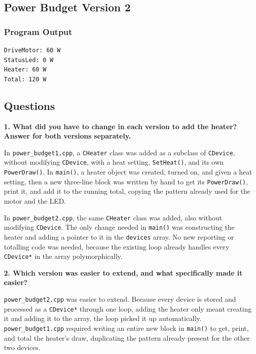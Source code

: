 \documentclass[10pt,a4paper]{article}
\newcommand{\question}[1]{%
    \vspace{5pt}
    \textbf{#1}\par
    \vspace{2pt}
}
\begin{document}
\subsection{Power Budget Version 2}

\subsubsection{Program Output}

\begin{lstlisting}[style=output]
DriveMotor: 60 W
StatusLed: 0 W
Heater: 60 W
Total: 120 W
\end{lstlisting}

\subsection{Questions}

\question{1. What did you have to change in each version to add the heater? Answer for both versions separately.}

In \texttt{power\_budget1.cpp}, a \texttt{CHeater} class was added as a
subclass of \texttt{CDevice}, without modifying \texttt{CDevice}, with a
heat setting, \texttt{SetHeat()}, and its own \texttt{PowerDraw()}. In
\texttt{main()}, a heater object was created, turned on, and given a heat
setting, then a new three-line block was written by hand to get its
\texttt{PowerDraw()}, print it, and add it to the running total,
copying the pattern already used for the motor and the LED.

In \texttt{power\_budget2.cpp}, the same \texttt{CHeater} class was added,
also without modifying \texttt{CDevice}. The only change needed in
\texttt{main()} was constructing the heater and adding a pointer to it in
the \texttt{devices} array. No new reporting or totalling code was needed,
because the existing loop already handles every \texttt{CDevice*} in the
array polymorphically.

\question{2. Which version was easier to extend, and what specifically made it easier?}

\texttt{power\_budget2.cpp} was easier to extend. Because every device is
stored and processed as a \texttt{CDevice*} through one loop, adding the
heater only meant creating it and adding it to the array, the loop
picked it up automatically. \texttt{power\_budget1.cpp} required writing
an entire new block in \texttt{main()} to get, print, and total the
heater's draw, duplicating the pattern already present for the other two
devices.
\end{document}
